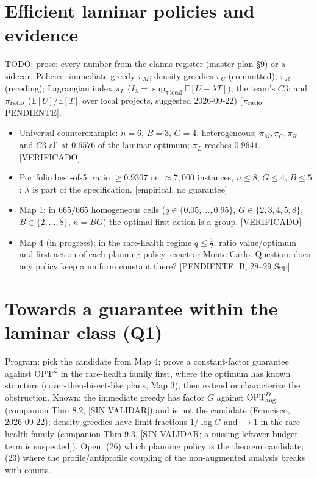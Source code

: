 \documentclass[11pt]{article}
\theoremstyle{remark}
\newcommand{\status}[1]{\textcolor{blue!60!black}{\textsf{\small [#1]}}}
\newcommand{\todo}[1]{\textcolor{red!70!black}{\textsf{\small TODO: #1}}}
\newcommand{\OPT}{\mathrm{OPT}}
\newcommand{\Lam}{\mathcal L}
\begin{document}
\section{Efficient laminar policies and evidence}\label{sec:policies}
\todo{prose; every number from the claims register (master plan §9) or a sidecar.}
Policies: immediate greedy $\pi_M$; density greedies $\pi_C$ (committed), $\pi_R$ (receding); Lagrangian index $\pi_L$ ($I_\lambda=\sup_{\pi\ \mathrm{local}}\mathbb E[U-\lambda T]$); the team's $C3$; and $\pi_{\rm ratio}$ ($\mathbb E[U]/\mathbb E[T]$ over local projects, suggested 2026-09-22) \status{$\pi_{\rm ratio}$ PENDIENTE}.
\begin{itemize}
\item Universal counterexample: $n=6$, $B=3$, $G=4$, heterogeneous; $\pi_M,\pi_C,\pi_R$ and $C3$ all at $0.6576$ of the laminar optimum; $\pi_L$ reaches $0.9641$. \status{VERIFICADO}
\item Portfolio best-of-5: ratio $\ge0.9307$ on $\approx7{,}000$ instances, $n\le8$, $G\le4$, $B\le5$; $\lambda$ is part of the specification. \status{empirical, no guarantee}
\item Map 1: in $665/665$ homogeneous cells ($q\in\{0.05,\dots,0.95\}$, $G\in\{2,3,4,5,8\}$, $B\in\{2,\dots,8\}$, $n=BG$) the optimal first action is a group. \status{VERIFICADO}
\item Map 4 (in progress): in the rare-health regime $q\le\tfrac12$, ratio value/optimum and first action of each planning policy, exact or Monte Carlo. Question: does any policy keep a uniform constant there? \status{PENDIENTE, B, 28--29 Sep}
\end{itemize}

\section{Towards a guarantee within the laminar class (Q1)}\label{sec:guarantee}
Program: pick the candidate from Map 4; prove a constant-factor guarantee against $\OPT^{\Lam}$ in the rare-health family first, where the optimum has known structure (cover-then-bisect-like plans, Map 3), then extend or characterize the obstruction. Known: the immediate greedy has factor $G$ against $\OPT^{D}_{\rm aug}$ (companion Thm 8.2, \status{SIN VALIDAR}) and is not the candidate (Francisco, 2026-09-22); density greedies have limit fractions $1/\log G$ and $\to1$ in the rare-health family (companion Thm 9.3, \status{SIN VALIDAR; a missing leftover-budget term is suspected}). Open: (26) which planning policy is the theorem candidate; (23) where the profile/antiprofile coupling of the non-augmented analysis breaks with counts.
\end{document}
